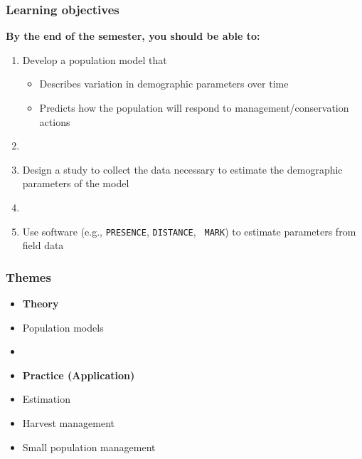 \documentclass[color=usenames,dvipsnames]{beamer}
\begin{document}
\begin{frame}
  \frametitle{Learning objectives}
  \large
  {\bf By the end of the semester, you should be able to: \\}
  \vspace{0.3cm}
  \begin{enumerate}[\bf (1)]
    \large
    \item<1-> Develop a population model that
      \begin{itemize}
        \normalsize %
        \item Describes variation in demographic parameters over time
        \item Predicts how the population will respond to
          management/conservation actions
      \end{itemize}
    \item[]
    \item<2-> Design a study to collect the data necessary to estimate
      the demographic parameters of the model
    \item[]
    \item<3-> Use software (e.g., {\tt PRESENCE}, {\tt DISTANCE}, {\tt
        MARK}) to estimate parameters from field data
  \end{enumerate}
\end{frame}







\begin{frame}
  \frametitle{Themes}
  \large
  \begin{itemize}
    \item[] {\hspace{-0.9cm} \bf Theory}
    \item Population models
    \item[]
    \item[] {\hspace{-0.9cm} \bf Practice (Application)}
    \item Estimation
    \item Harvest management
    \item Small population management
  \end{itemize}
\end{frame}
\end{document}
